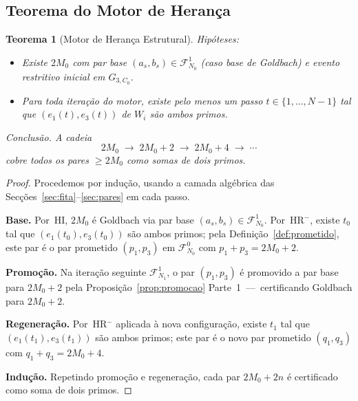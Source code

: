 \documentclass[12pt, a4paper]{article}
\theoremstyle{plain}
\newtheorem{theorem}{Teorema}[section]
\theoremstyle{definition}
\theoremstyle{remark}
\begin{document}
	\subsection{Teorema do Motor de Herança}
	
	\begin{theorem}[Motor de Herança Estrutural]
		\label{thm:motor}
		\textit{Hipóteses:}
		\begin{itemize}
			\item[\textbf{(HI)}] Existe $2M_0$ com par base
			$(a_s,b_s)\in\mathcal{F}_{N_0}^1$ (caso base de Goldbach)
			e evento restritivo inicial em $G_{3,C_0}$.
			\item[\textbf{(HR$^-$)}] Para toda iteração do motor, existe
			pelo menos um passo $t\in\{1,\ldots,N-1\}$ tal que
			$(e_1(t),e_3(t))$ de $W_i$ são ambos primos.
		\end{itemize}
		
		\textit{Conclusão.}  A cadeia
		\[
		2M_0 \;\longrightarrow\; 2M_0+2 \;\longrightarrow\; 2M_0+4
		\;\longrightarrow\; \cdots
		\]
		cobre todos os pares $\geq 2M_0$ como somas de dois primos.
	\end{theorem}
	
	\begin{proof}
		Procedemos por indução, usando a camada algébrica das
		Secções~\ref{sec:fita}--\ref{sec:pares} em cada passo.
		
		\textbf{Base.}  Por~HI, $2M_0$ é Goldbach via par base
		$(a_s,b_s)\in\mathcal{F}_{N_0}^1$.  Por~HR$^-$, existe $t_0$
		tal que $(e_1(t_0),e_3(t_0))$ são ambos primos; pela
		Definição~\ref{def:prometido}, este par é o par prometido
		$(p_1,p_3)$ em $\mathcal{F}_{N_0}^0$ com
		$p_1+p_3=2M_0+2$.
		
		\textbf{Promoção.}  Na iteração seguinte $\mathcal{F}_{N_1}^1$,
		o par $(p_1,p_3)$ é promovido a par base para $2M_0+2$
		pela Proposição~\ref{prop:promocao} Parte~1~---~certificando
		Goldbach para $2M_0+2$.
		
		\textbf{Regeneração.}  Por~HR$^-$ aplicada à nova configuração,
		existe $t_1$ tal que $(e_1(t_1),e_3(t_1))$ são ambos primos;
		este par é o novo par prometido $(q_1,q_3)$ com
		$q_1+q_3=2M_0+4$.
		
		\textbf{Indução.}  Repetindo promoção e regeneração, cada par
		$2M_0+2n$ é certificado como soma de dois primos.
	\end{proof}
	
\end{document}
